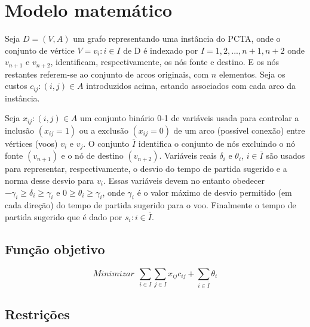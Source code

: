   \chapter{Modelo matemático}
  
Seja $D = (V,A)$ um grafo representando uma instância do PCTA, onde o conjunto de vértice $V = {v_{i}:i \in I}$ de D é indexado por $I = {1, 2, ..., n+1, n+2}$ onde $v_{n+1}$ e $v_{n+2}$, identificam, respectivamente, os nós fonte e destino. E os nós restantes referem-se ao conjunto de arcos originais, com $n$ elementos. Seja os custos ${c_{ij}:(i,j) \in A}$ introduzidos acima, estando associados com cada arco da instância.
  
Seja ${x_{ij}:(i,j) \in A}$ um conjunto binário 0-1 de variáveis usada para controlar a inclusão $(x_{ij} = 1)$ ou a exclusão $(x_{ij} = 0)$ de um arco (possível conexão) entre vértices (voos) $v_{i}$ e $v_{j}$. O conjunto $\overline{I}$ identifica o conjunto de nós excluindo o nó fonte $(v_{n+1})$ e o nó de destino $(v_{n+2})$. Variáveis reais $\delta_{i}$ e $\theta_{i}$, $i \in \overline{I}$ são usados para representar, respectivamente, o desvio do tempo de partida sugerido e a norma desse desvio para $v_{i}$. Essas variáveis devem no entanto obedecer $-\gamma_{i} \geq \delta_{i} \geq \gamma_{i}$ e $0 \geq \theta_{i} \geq \gamma_{i}$, onde $\gamma_{i}$ é o valor máximo de desvio permitido (em cada direção) do tempo de partida sugerido para o voo. Finalmente o tempo de partida sugerido que é dado por $s_{i}:i \in \overline{I}$.
  
\section{Função objetivo}

\begin{equation}
Minimizar \   \ \sum_{i \in I} \sum_{j \in I} x_{ij}c_{ij} + \sum_{i \in \overline{I}} \theta_{i}
\end{equation}

\section{Restrições}

